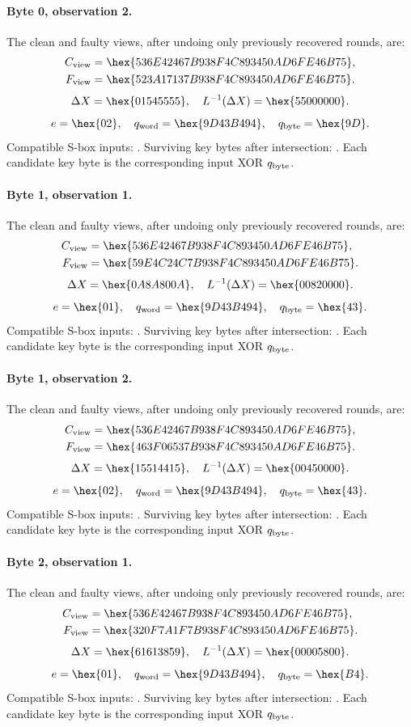 \paragraph{Byte 0, observation 2.}
The clean and faulty views, after undoing only previously recovered rounds, are:
\[\begin{aligned}C_{\rm view}&=\hex{536E42467B938F4C893450AD6FE46B75},\\F_{\rm view}&=\hex{523A17137B938F4C893450AD6FE46B75}.\end{aligned}\]
\[\Delta X=\hex{01545555},\quad L^{-1}(\Delta X)=\hex{55000000}.\]
\[e=\hex{02},\quad q_{\rm word}=\hex{9D43B494},\quad q_{\rm byte}=\hex{9D}.\]
Compatible S-box inputs: . Surviving key bytes after intersection: . Each candidate key byte is the corresponding input XOR $q_{\rm byte}$.
\paragraph{Byte 1, observation 1.}
The clean and faulty views, after undoing only previously recovered rounds, are:
\[\begin{aligned}C_{\rm view}&=\hex{536E42467B938F4C893450AD6FE46B75},\\F_{\rm view}&=\hex{59E4C24C7B938F4C893450AD6FE46B75}.\end{aligned}\]
\[\Delta X=\hex{0A8A800A},\quad L^{-1}(\Delta X)=\hex{00820000}.\]
\[e=\hex{01},\quad q_{\rm word}=\hex{9D43B494},\quad q_{\rm byte}=\hex{43}.\]
Compatible S-box inputs: . Surviving key bytes after intersection: . Each candidate key byte is the corresponding input XOR $q_{\rm byte}$.
\paragraph{Byte 1, observation 2.}
The clean and faulty views, after undoing only previously recovered rounds, are:
\[\begin{aligned}C_{\rm view}&=\hex{536E42467B938F4C893450AD6FE46B75},\\F_{\rm view}&=\hex{463F06537B938F4C893450AD6FE46B75}.\end{aligned}\]
\[\Delta X=\hex{15514415},\quad L^{-1}(\Delta X)=\hex{00450000}.\]
\[e=\hex{02},\quad q_{\rm word}=\hex{9D43B494},\quad q_{\rm byte}=\hex{43}.\]
Compatible S-box inputs: . Surviving key bytes after intersection: . Each candidate key byte is the corresponding input XOR $q_{\rm byte}$.
\paragraph{Byte 2, observation 1.}
The clean and faulty views, after undoing only previously recovered rounds, are:
\[\begin{aligned}C_{\rm view}&=\hex{536E42467B938F4C893450AD6FE46B75},\\F_{\rm view}&=\hex{320F7A1F7B938F4C893450AD6FE46B75}.\end{aligned}\]
\[\Delta X=\hex{61613859},\quad L^{-1}(\Delta X)=\hex{00005800}.\]
\[e=\hex{01},\quad q_{\rm word}=\hex{9D43B494},\quad q_{\rm byte}=\hex{B4}.\]
Compatible S-box inputs: . Surviving key bytes after intersection: . Each candidate key byte is the corresponding input XOR $q_{\rm byte}$.
